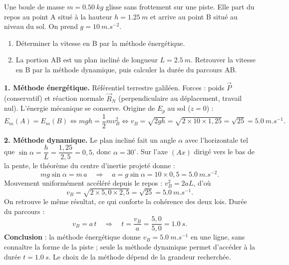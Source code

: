 \documentclass[11pt]{article}
\begin{document}
\begin{exoresolu}
Une boule de masse $m = \SI{0,50}{kg}$ glisse sans frottement sur une piste. Elle part du repos au point A situé à la hauteur $h = \SI{1,25}{m}$ et arrive au point B situé au niveau du sol. On prend $g = \SI{10}{m.s^{-2}}$.
\begin{enumerate}
\item Déterminer la vitesse en B par la méthode énergétique.
\item La portion AB est un plan incliné de longueur $L = \SI{2,5}{m}$. Retrouver la vitesse en B par la méthode dynamique, puis calculer la durée du parcours AB.
\end{enumerate}
\tcblower
\textbf{1. Méthode énergétique.} Référentiel terrestre galiléen. Forces : poids $\vec{P}$ (conservatif) et réaction normale $\vec{R}_N$ (perpendiculaire au déplacement, travail nul). L'énergie mécanique se conserve. Origine de $E_p$ au sol ($z=0$) :
\[ E_m(A) = E_m(B) \iff mgh = \frac{1}{2}mv_B^2 \iff v_B = \sqrt{2gh} = \sqrt{2\times 10 \times 1{,}25} = \sqrt{25} = \SI{5,0}{m.s^{-1}}. \]

\textbf{2. Méthode dynamique.} Le plan incliné fait un angle $\alpha$ avec l'horizontale tel que $\sin\alpha = \dfrac{h}{L} = \dfrac{1{,}25}{2{,}5} = 0{,}5$, donc $\alpha = 30^{\circ}$. Sur l'axe $(Ax)$ dirigé vers le bas de la pente, le théorème du centre d'inertie projeté donne :
\[ mg\sin\alpha = m\,a \quad \Longrightarrow \quad a = g\sin\alpha = 10 \times 0{,}5 = \SI{5,0}{m.s^{-2}}. \]
Mouvement uniformément accéléré depuis le repos : $v_B^2 = 2aL$, d'où
\[ v_B = \sqrt{2 \times 5{,}0 \times 2{,}5} = \sqrt{25} = \SI{5,0}{m.s^{-1}}. \]
On retrouve le même résultat, ce qui conforte la cohérence des deux lois. Durée du parcours :
\[ v_B = a\,t \quad \Longrightarrow \quad t = \frac{v_B}{a} = \frac{5{,}0}{5{,}0} = \SI{1,0}{s}. \]
\textbf{Conclusion} : la méthode énergétique donne $v_B = \SI{5,0}{m.s^{-1}}$ en une ligne, sans connaître la forme de la piste ; seule la méthode dynamique permet d'accéder à la durée $t = \SI{1,0}{s}$. Le choix de la méthode dépend de la grandeur recherchée.
\end{exoresolu}
\end{document}
